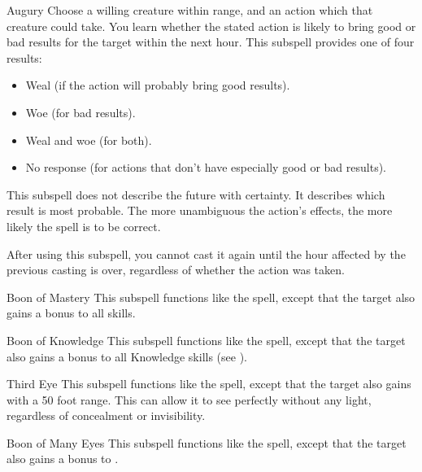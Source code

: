 \begin{ability}[\nth{3}]{Augury}
Choose a willing creature within \rngclose range, and an action which that creature could take.
You learn whether the stated action is likely to bring good or bad results for the target within the next hour.
This subspell provides one of four results:
\begin{itemize}
\item Weal (if the action will probably bring good results).
\item Woe (for bad results).
\item Weal and woe (for both).
\item No response (for actions that don't have especially good or bad results).
\end{itemize}

This subspell does not describe the future with certainty.
It describes which result is most probable.
The more unambiguous the action's effects, the more likely the spell is to be correct.

After using this subspell, you cannot cast it again until the hour affected by the previous casting is over, regardless of whether the action was taken.
\end{ability}
\vspace{0.25em}


\begin{ability}[\nth{3}]{Boon of Mastery}
This subspell functions like the  spell, except that the target also gains a  bonus to all skills.
\end{ability}
\vspace{0.25em}


\begin{ability}[\nth{4}]{Boon of Knowledge}
This subspell functions like the  spell, except that the target also gains a  bonus to all Knowledge skills (see ).
\end{ability}
\vspace{0.25em}


\begin{ability}[\nth{4}]{Third Eye}
This subspell functions like the  spell, except that the target also gains  with a 50 foot range.
This can allow it to see perfectly without any light, regardless of concealment or invisibility.
\end{ability}
\vspace{0.25em}


\begin{ability}[\nth{5}]{Boon of Many Eyes}
This subspell functions like the  spell, except that the target also gains a  bonus to .
\end{ability}
\vspace{0.25em}



